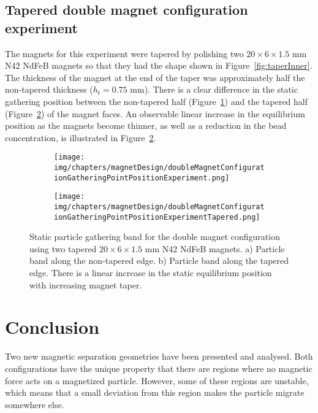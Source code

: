 \subsection{Tapered double magnet configuration experiment}
The magnets for this experiment were tapered by polishing two $20 \times 6 \times 1.5$ mm N42 NdFeB magnets so that they had the shape shown in Figure~\ref{fig:taperInner}. The thickness of the magnet at the end of the taper was approximately half the non-tapered thickness ($h_{t}=0.75$ mm). There is a clear difference in the static gathering position between the non-tapered half (Figure~\ref{fig:nonTaperedMagnetExperiement}) and the tapered half (Figure~\ref{fig:taperedMagnetExperiement}) of the magnet faces. An observable linear increase in the equilibrium position as the magnets become thinner, as well as a reduction in the bead concentration, is illustrated in Figure~\ref{fig:taperedMagnetExperiement}.

\begin{figure}[!htb]
\centering
	\begin{subfigure}[b]{0.48\textwidth}
		\texttt{[image: img/chapters/magnetDesign/doubleMagnetConfigurationGatheringPointPositionExperiment.png]}
	\caption{}
    \label{fig:nonTaperedMagnetExperiement}
    \end{subfigure}
    \hfill
	\begin{subfigure}[b]{0.48\textwidth}
		\texttt{[image: img/chapters/magnetDesign/doubleMagnetConfigurationGatheringPointPositionExperimentTapered.png]}
	\caption{}
	\label{fig:taperedMagnetExperiement}
	\end{subfigure}
\caption[Static particle gathering band for tapered double magnet configuration]{Static particle gathering band for the double magnet configuration using two tapered $20 \times 6 \times 1.5$ mm N42 NdFeB magnets. a) Particle band along the non-tapered edge. b) Particle band along the tapered edge. There is a linear increase in the static equilibrium position with increasing magnet taper.}%
\label{fig:taperedMagnetGatheringPointExperiment}
\end{figure}

\section{Conclusion}\label{sec:conclusionMagneticSeparationDesign}
Two new magnetic separation geometries have been presented and analysed. Both configurations have the unique property that there are regions where no magnetic force acts on a magnetized particle. However, some of these regions are unstable, which means that a small deviation from this region makes the particle migrate somewhere else. 

